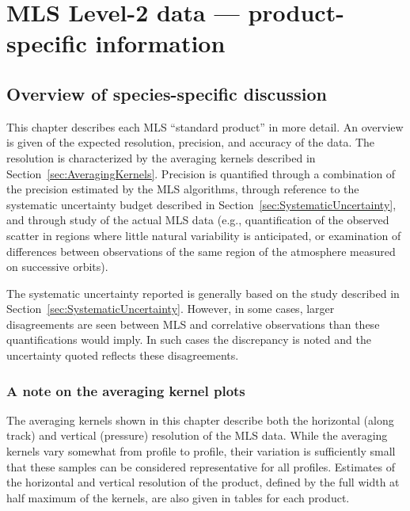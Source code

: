 \chapter{MLS Level-2 data --- product-specific information}
\label{chap:Level2}

\section{Overview of species-specific discussion}

This chapter describes each MLS \thisv ``standard product'' in more detail.  An overview is given of the expected resolution, precision, and accuracy of the data.  The resolution is characterized by the averaging kernels described in Section~\ref{sec:AveragingKernels}.  Precision is quantified through a combination of the precision estimated by the MLS \thisv algorithms, through reference to the systematic uncertainty budget described in Section~\ref{sec:SystematicUncertainty}, and through study of the actual MLS data (e.g., quantification of the observed scatter in regions where little natural variability is anticipated, or examination of differences between observations of the same region of the atmosphere measured on successive orbits).

The systematic uncertainty reported is generally based on the study described in Section~\ref{sec:SystematicUncertainty}.  However, in some cases, larger disagreements are seen between MLS and correlative observations than these quantifications would imply.  In such cases the discrepancy is noted and the uncertainty quoted reflects these disagreements.

\subsection{A note on the averaging kernel plots}

The averaging kernels shown in this chapter describe both the horizontal (along track) and vertical (pressure) resolution of the MLS \thisv data. While the averaging kernels vary somewhat from profile to profile, their variation is sufficiently small that these samples can be considered representative for all profiles. Estimates of the horizontal and vertical resolution of the product, defined by the full width at half maximum of the kernels, are also given in tables for each product.

\ProductSections






















\RegularSections
\clearpage
